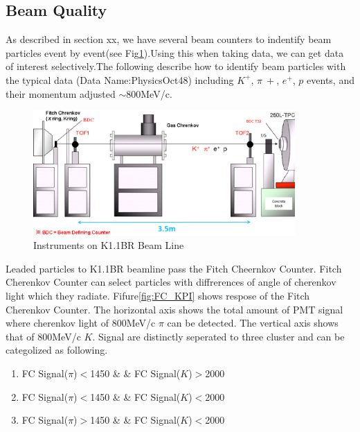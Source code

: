 \subsection{Beam Quality}

As described in section xx, we have several beam counters to indentify beam particles event by event(see Fig\ref{fig:Beamline}).Using this when taking data, we can get data of interest selectively.The following describe how to identify beam particles with the typical data (Data Name:PhysicsOct48) including $K^{+}$, $\pi~{+}$, $e^{+}$, $p$ events, and their momentum adjusted $\sim$800MeV/c. \\

\begin{figure}[htbp]
  \centering
  \includegraphics[width=10cm,clip]{fig/Beamline.eps}
  \caption{Instruments on K1.1BR Beam Line}
  \label{fig:Beamline}
\end{figure}

Leaded particles to K1.1BR beamline pass the Fitch Cheernkov Counter.
Fitch Cherenkov Counter can select particles with diffrerences of angle of cherenkov light which they radiate.
Fifure\ref{fig:FC_KPI} shows respose of the Fitch Cherenkov Counter.
The horizontal axis shows the total amount of PMT signal where cherenkov light of 800MeV/c $\pi$ can be detected.
The vertical axis shows that of 800MeV/c $K$.
Signal are distinctly seperated to three cluster and can be categolized as following.\\

\begin{enumerate}
\item FC Signal($\pi$)$<$1450 \& \& FC Signal($K$)$>$2000 \\
\item FC Signal($\pi$)$<$1450 \& \& FC Signal($K$)$<$2000 \\
\item FC Signal($\pi$)$>$1450 \& \& FC Signal($K$)$<$2000 \\
\end{enumerate}

